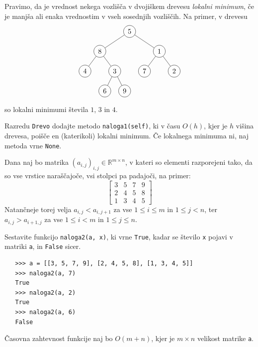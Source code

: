 \documentclass[arhiv]{izpit}
\begin{document}

\naloga[30 točk]

Pravimo, da je vrednost nekega vozlišča v dvojiškem drevesu \emph{lokalni minimum},
  če je manjša ali enaka vrednostim v vseh sosednjih vozliščih.
Na primer, v drevesu
%
\[
  \begin{tikzpicture}[level distance=1cm,
    level 1/.style={sibling distance=3cm},
    level 2/.style={sibling distance=1.5cm},
    level 3/.style={sibling distance=1cm}
    ]
    \node[circle, draw] (d) {5}
      child {node[circle, draw] {8}
        child {node[circle, draw] {4}}
        child {node[circle, draw] {3}
          child {node[circle, draw] {6}}
          child {node[circle, draw] {9}}
        }
      }
      child {node[circle, draw] {1}
        child {node[circle, draw] {7}}
        child {node[circle, draw] {2}}
      };
  \end{tikzpicture}
\]
%
so lokalni minimumi števila $1$, $3$ in $4$.

Razredu \verb|Drevo| dodajte metodo \verb|naloga1(self)|,
  ki v času $O(h)$, kjer je $h$ višina drevesa,
  poišče en (katerikoli) lokalni minimum.
Če lokalnega minimuma ni, naj metoda vrne \verb|None|.


\naloga[30 točk]

Dana naj bo matrika $(a_{i,j})_{i,j} \in \mathbb{R}^{m \times n}$,
  v kateri so elementi razporejeni tako, da so vse vrstice naraščajoče,
  vsi stolpci pa padajoči, na primer:
%
\[
  \begin{bmatrix}
    3 & 5 & 7 & 9 \\
    2 & 4 & 5 & 8 \\
    1 & 3 & 4 & 5
  \end{bmatrix}
\]
%
Natančneje torej velja $a_{i,j} < a_{i,j+1}$ za vse $1 \le i \le m$ in $1 \le j < n$,
ter $a_{i,j} > a_{i+1,j}$ za vse $1 \le i < m$ in $1 \le j \le n$.

Sestavite funkcijo \verb|naloga2(a, x)|, ki vrne \verb|True|, kadar
  se število \verb|x| pojavi v matriki \verb|a|, in \verb|False| sicer.
{\small\begin{verbatim}
   >>> a = [[3, 5, 7, 9], [2, 4, 5, 8], [1, 3, 4, 5]]
   >>> naloga2(a, 7)
   True
   >>> naloga2(a, 2)
   True
   >>> naloga2(a, 6)
   False\end{verbatim}}
Časovna zahtevnost funkcije naj bo $O(m + n)$, kjer je $m \times n$ velikost matrike \verb|a|.
\end{document}
